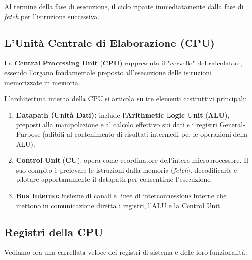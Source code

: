\documentclass[12pt]{report}
\begin{document}
	Al termine della fase di esecuzione, il ciclo riparte immediatamente dalla fase di \textit{fetch} per l'istruzione successiva.
	
	\subsection{L'Unità Centrale di Elaborazione (CPU)}
	
	La \textbf{Central Processing Unit} (\textbf{CPU}) rappresenta il "cervello" del calcolatore, essendo l'organo fondamentale preposto all'esecuzione delle istruzioni memorizzate in memoria.
	
	L'architettura interna della CPU si articola su tre elementi costruttivi principali:
	
	\begin{enumerate}
		\item \textbf{Datapath (Unità Dati):} include l'\textbf{Arithmetic Logic Unit} (\textbf{ALU}), preposti alla manipolazione e al calcolo effettivo sui dati e i registri General-Purpose (adibiti al contenimento di risultati intermedi per le operazioni della ALU).
		
		\item \textbf{Control Unit} (\textbf{CU}): opera come coordinatore dell'intero microprocessore. Il suo compito è prelevare le istruzioni dalla memoria (\textit{fetch}), decodificarle e pilotare opportunamente il datapath per consentirne l'esecuzione.
		
		\item \textbf{Bus Interno:} insieme di canali e linee di interconnessione interne che mettono in comunicazione diretta i registri, l'ALU e la Control Unit.
	\end{enumerate}
	
	\subsection{Registri della CPU}
	Vediamo ora una carrellata veloce dei registri di sistema e delle loro funzionalità:
	
\end{document}
